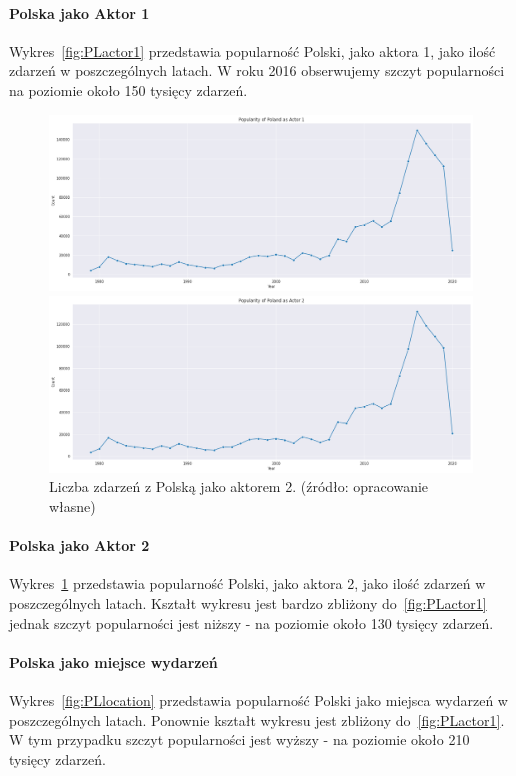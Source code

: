 \documentclass[11pt]{report}
\begin{document}
    \paragraph{Polska jako Aktor 1}
    Wykres~\ref{fig:PLactor1} przedstawia popularność Polski, jako aktora 1, jako ilość zdarzeń w poszczególnych latach.
    W roku 2016 obserwujemy szczyt popularności na poziomie około 150 tysięcy zdarzeń.
    \begin{figure}[!htp]
        \centering
        \includegraphics[width=\linewidth]{fig/PL/PLactor1.png}
        \caption{Liczba zdarzeń z Polską jako aktorem 1. (źródło: opracowanie własne)}
        \label{fig:PLactor1}
        \includegraphics[width=\linewidth]{fig/PL/PLactor2.png}
        \caption{Liczba zdarzeń z Polską jako aktorem 2. (źródło: opracowanie własne)}
        \label{fig:PLactor2}
    \end{figure}

    \paragraph{Polska jako Aktor 2}
    Wykres~\ref{fig:PLactor2} przedstawia popularność Polski, jako aktora 2, jako ilość zdarzeń w poszczególnych latach.
    Kształt wykresu jest bardzo zbliżony do~\ref{fig:PLactor1} jednak szczyt popularności jest niższy - na poziomie około 130 tysięcy zdarzeń.

    \paragraph{Polska jako miejsce wydarzeń}
    Wykres~\ref{fig:PLlocation} przedstawia popularność Polski jako miejsca wydarzeń w poszczególnych latach.
    Ponownie kształt wykresu jest zbliżony do~\ref{fig:PLactor1}.
    W tym przypadku szczyt popularności jest wyższy - na poziomie około 210 tysięcy zdarzeń.
\end{document}

